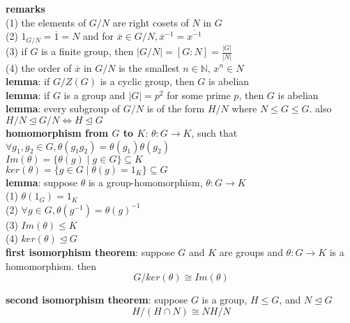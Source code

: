\documentclass[a4paper]{article}
\newcommand\abs[1]{\ensuremath{\lvert#1\rvert}}
\begin{document}
\begin{multicols}{2}
\begin{framed}
	\noindent
	\textbf{remarks}\\
	(1) the elements of $G/N$ are right cosets of $N$ in $G$\\
	(2) $1_{G/N} = \overline{1} = N$ and for $\overline{x} \in G/N, \overline{x}^{-1} = \overline{x^{-1}}$\\
	(3) if $G$ is a finite group, then $\abs{G/N} = [G:N] = \frac{\abs{G}}{\abs{N}}$\\
	(4) the order of $\overline{x}$ in $G/N$ is the smallest $n \in \mathbb{N}$, $x^n \in N$\\
	
	\noindent
	\textbf{lemma}: if $G / Z(G)$ is a cyclic group, then $G$ is abelian\\
	
	\noindent
	\textbf{lemma}: if $G$ is a group and $\abs{G} = p^2$ for some prime $p$, then $G$ is abelian\\
	
	\noindent
	\textbf{lemma}: every subgroup of $G / N$ is of the form $H / N$ where $N \leq G \leq G$. also $H / N \unlhd G /N \iff H \unlhd G$\\
	
	\noindent
	\textbf{homomorphism from $G$ to $K$}: $\theta: G \rightarrow K$, such that $\forall g_1, g_2 \in G, \theta(g_1 g_2) = \theta(g_1)\theta(g_2)$\\
	$Im(\theta) = \{\theta(g) \; \vert \; g \in G\} \subseteq K$\\
	$ker(\theta) = \{g \in G \; \vert \; \theta(g) = 1_K\} \subseteq G$\\
	
	\noindent
	\textbf{lemma}: suppose $\theta$ is a group-homomorphism, $\theta: G \rightarrow K$\\
	(1) $\theta(1_G) = 1_K$\\
	(2) $\forall g \in G, \theta(g^{-1}) = \theta(g)^{-1}$\\
	(3) $Im(\theta) \leq K$\\
	(4) $ker(\theta) \unlhd G$\\
	
	\noindent
	\textbf{first isomorphism theorem}: suppose $G$ and $K$ are groups and $\theta: G \rightarrow K$ is a homomorphism. then 
	$$G / ker(\theta) \cong Im(\theta)$$
	
	\noindent
	\textbf{second isomorphism theorem}: suppose $G$ is a group, $H \leq G$, and $N \unlhd G$
	$$H / (H \cap N) \cong NH / N$$

\end{framed}


\end{multicols}
\end{document}
